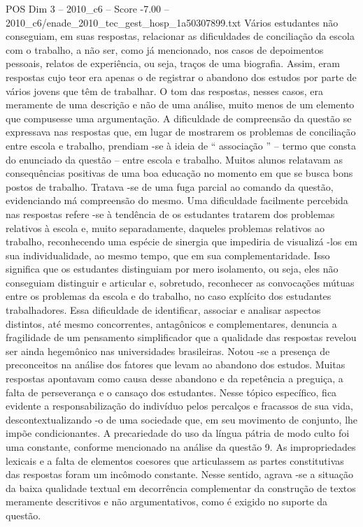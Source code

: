 \begin{textsample}{POS Dim 3 – 2010\_c6 – Score -7.00 – 2010\_c6/enade\_2010\_tec\_gest\_hosp\_1a50307899.txt}
Vários estudantes não conseguiam, em suas respostas, relacionar as dificuldades de conciliação da escola com o trabalho, a não ser, como já mencionado, nos casos de depoimentos pessoais, relatos de experiência, ou seja, traços de uma biografia.
Assim, eram respostas cujo teor era apenas o de registrar o abandono dos estudos por parte de vários jovens que têm de trabalhar.
O tom das respostas, nesses casos, era meramente de uma descrição e não de uma análise, muito menos de um elemento que compusesse uma argumentação.
A dificuldade de compreensão da questão se expressava nas respostas que, em lugar de mostrarem os problemas de conciliação entre escola e trabalho, prendiam -se à ideia de “ associação ” – termo que consta do enunciado da questão – entre escola e trabalho.
Muitos alunos relatavam as consequências positivas de uma boa educação no momento em que se busca bons postos de trabalho.
Tratava -se de uma fuga parcial ao comando da questão, evidenciando má compreensão do mesmo.
Uma dificuldade facilmente percebida nas respostas refere -se à tendência de os estudantes tratarem dos problemas relativos à escola e, muito separadamente, daqueles problemas relativos ao trabalho, reconhecendo uma espécie de sinergia que impediria de visualizá -los em sua individualidade, ao mesmo tempo, que em sua complementaridade.
Isso significa que os estudantes distinguiam por mero isolamento, ou seja, eles não conseguiam distinguir e articular e, sobretudo, reconhecer as convocações mútuas entre os problemas da escola e do trabalho, no caso explícito dos estudantes trabalhadores.
Essa dificuldade de identificar, associar e analisar aspectos distintos, até mesmo concorrentes, antagônicos e complementares, denuncia a fragilidade de um pensamento simplificador que a qualidade das respostas revelou ser ainda hegemônico nas universidades brasileiras.
Notou -se a presença de preconceitos na análise dos fatores que levam ao abandono dos estudos.
Muitas respostas apontavam como causa desse abandono e da repetência a preguiça, a falta de perseverança e o cansaço dos estudantes.
Nesse tópico específico, fica evidente a responsabilização do indivíduo pelos percalços e fracassos de sua vida, descontextualizando -o de uma sociedade que, em seu movimento de conjunto, lhe impõe condicionantes.
A precariedade do uso da língua pátria de modo culto foi uma constante, conforme mencionado na análise da questão 9.
As impropriedades lexicais e a falta de elementos coesores que articulassem as partes constitutivas das respostas foram um incômodo constante.
Nesse sentido, agrava -se a situação da baixa qualidade textual em decorrência complementar da construção de textos meramente descritivos e não argumentativos, como é exigido no suporte da questão.

\end{textsample}
